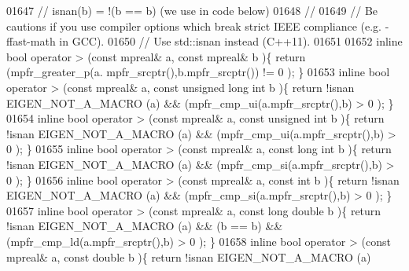 \begin{DoxyCode}
01647 \textcolor{comment}{// isnan(b) = !(b == b)  (we use in code below)}
01648 \textcolor{comment}{//}
01649 \textcolor{comment}{// Be cautions if you use compiler options which break strict IEEE compliance (e.g. -ffast-math in GCC).}
01650 \textcolor{comment}{// Use std::isnan instead (C++11).}
01651 
01652 \textcolor{keyword}{inline} \textcolor{keywordtype}{bool} operator >  (\textcolor{keyword}{const} mpreal& a, \textcolor{keyword}{const} mpreal& b           )\{  \textcolor{keywordflow}{return} (mpfr\_greater\_p(a.
      mpfr\_srcptr(),b.mpfr\_srcptr()) != 0 );            \}
01653 \textcolor{keyword}{inline} \textcolor{keywordtype}{bool} operator >  (\textcolor{keyword}{const} mpreal& a, \textcolor{keyword}{const} \textcolor{keywordtype}{unsigned} \textcolor{keywordtype}{long} \textcolor{keywordtype}{int} b )\{  \textcolor{keywordflow}{return} !isnan EIGEN\_NOT\_A\_MACRO (a)
       && (mpfr\_cmp\_ui(a.mpfr\_srcptr(),b) > 0 );                 \}
01654 \textcolor{keyword}{inline} \textcolor{keywordtype}{bool} operator >  (\textcolor{keyword}{const} mpreal& a, \textcolor{keyword}{const} \textcolor{keywordtype}{unsigned} \textcolor{keywordtype}{int} b      )\{  \textcolor{keywordflow}{return} !isnan EIGEN\_NOT\_A\_MACRO (a)
       && (mpfr\_cmp\_ui(a.mpfr\_srcptr(),b) > 0 );                 \}
01655 \textcolor{keyword}{inline} \textcolor{keywordtype}{bool} operator >  (\textcolor{keyword}{const} mpreal& a, \textcolor{keyword}{const} \textcolor{keywordtype}{long} \textcolor{keywordtype}{int} b          )\{  \textcolor{keywordflow}{return} !isnan EIGEN\_NOT\_A\_MACRO (a)
       && (mpfr\_cmp\_si(a.mpfr\_srcptr(),b) > 0 );                 \}
01656 \textcolor{keyword}{inline} \textcolor{keywordtype}{bool} operator >  (\textcolor{keyword}{const} mpreal& a, \textcolor{keyword}{const} \textcolor{keywordtype}{int} b               )\{  \textcolor{keywordflow}{return} !isnan EIGEN\_NOT\_A\_MACRO (a)
       && (mpfr\_cmp\_si(a.mpfr\_srcptr(),b) > 0 );                 \}
01657 \textcolor{keyword}{inline} \textcolor{keywordtype}{bool} operator >  (\textcolor{keyword}{const} mpreal& a, \textcolor{keyword}{const} \textcolor{keywordtype}{long} \textcolor{keywordtype}{double} b       )\{  \textcolor{keywordflow}{return} !isnan EIGEN\_NOT\_A\_MACRO (a)
       && (b == b) && (mpfr\_cmp\_ld(a.mpfr\_srcptr(),b) > 0 );    \}
01658 \textcolor{keyword}{inline} \textcolor{keywordtype}{bool} operator >  (\textcolor{keyword}{const} mpreal& a, \textcolor{keyword}{const} \textcolor{keywordtype}{double} b            )\{  \textcolor{keywordflow}{return} !isnan EIGEN\_NOT\_A\_MACRO (a)

\end{DoxyCode}
